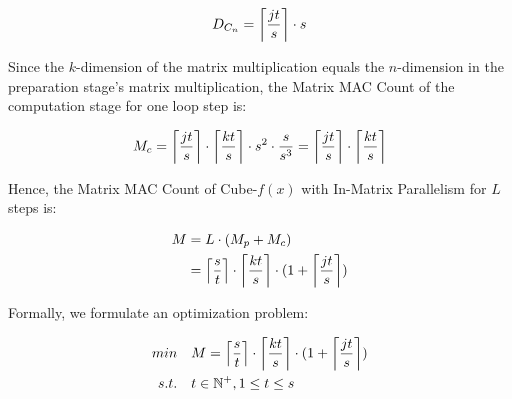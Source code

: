\documentclass[12pt]{extbook}
\DeclarePairedDelimiter\ceil{\lceil}{\rceil}
\begin{document}
\begin{equation}
    \label{eq:gen_4}
    \begin{aligned}
    D_{C_n} = \ceil*{\frac{jt}{s}} \cdot s
    \end{aligned}
    \end{equation}

Since the $k$-dimension of the matrix multiplication equals the $n$-dimension in the preparation stage's matrix multiplication, the Matrix MAC Count of the computation stage for one loop step is:

\begin{equation}
    \label{eq:gen_5}
    \begin{aligned}
    M_c = \ceil*{\frac{jt}{s}} \cdot \ceil*{\frac{kt}{s}} \cdot s^2 \cdot \frac{s}{s^3} = \ceil*{\frac{jt}{s}} \cdot \ceil*{\frac{kt}{s}}
    \end{aligned}
    \end{equation}

Hence, the Matrix MAC Count of Cube-$f(x)$ with In-Matrix Parallelism for $L$ steps is:

\begin{equation}
    \label{eq:gen_6}
    \begin{aligned}
    M &= L \cdot (M_p + M_c)  \\
      &= \ceil*{\frac{s}{t}} \cdot \ceil*{\frac{kt}{s}} \cdot (1 + \ceil*{\frac{jt}{s}})
    \end{aligned}
    \end{equation}

Formally, we formulate an optimization problem:

\begin{equation}
    \label{eq:optimized_2}
    \begin{aligned}
        min\quad &M = \ceil*{\frac{s}{t}} \cdot \ceil*{\frac{kt}{s}} \cdot (1 + \ceil*{\frac{jt}{s}}) \\
        s.t.\quad &t \in \mathbb{N}^{+}, 1 \le t \le s
    \end{aligned}
\end{equation}
\end{document}
